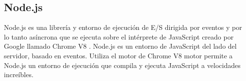 
 



  

\subsection{Node.js}

Node.js  \cite{URL::Nodejs} es una librería y entorno de ejecución de E/S dirigida por eventos y por lo tanto asíncrona que se ejecuta sobre el intérprete de JavaScript creado por Google llamado Chrome V8 \cite{URL::ChromeV8} . Node.js es un entorno de JavaScript del lado del servidor, basado en eventos. Utiliza el motor de Chrome V8 motor permite a Node.js un entorno de ejecución que compila y ejecuta JavaScript a velocidades increíbles.

